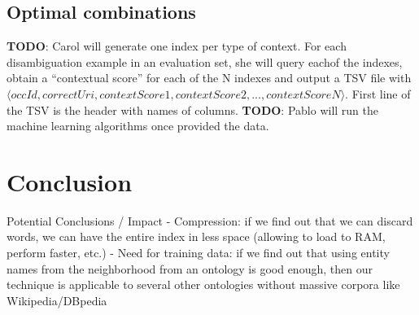 \documentclass[10pt,a4paper]{article}
\newcommand{\todo}[1]{{\color{red}\textsf{\textbf{TODO}}: #1}}
\begin{document}
\subsection{Optimal combinations}

\todo{Carol will generate one index per type of context. For each disambiguation example in an evaluation set, she will query eachof the indexes, obtain a ``contextual score'' for each of the N indexes and output a TSV file with $\langle occId, correctUri, contextScore1, contextScore2, ..., contextScoreN\rangle$. First line of the TSV is the header with names of columns.}
\todo{Pablo will run the machine learning algorithms once provided the data.}

\section{Conclusion}

Potential Conclusions / Impact
- Compression: if we find out that we can discard words, we can have the entire index in less space (allowing to load to RAM, perform faster, etc.)
- Need for training data: if we find out that using entity names from the neighborhood from an ontology is good enough, then our technique is applicable to several other ontologies without massive corpora like Wikipedia/DBpedia



\end{document}
